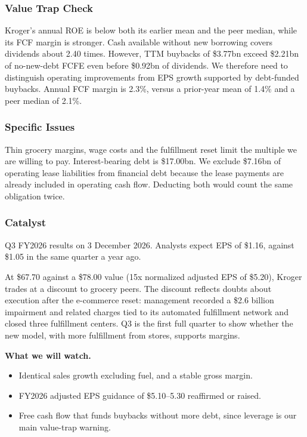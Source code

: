 \documentclass[10pt,a4paper]{article}
\begin{document}
\subsubsection*{Value Trap Check}
Kroger's annual ROE is below both its earlier mean and the peer median, while its FCF margin is stronger. Cash available without new borrowing covers dividends about 2.40 times. However, TTM buybacks of \$3.77bn exceed \$2.21bn of no-new-debt FCFE even before \$0.92bn of dividends. We therefore need to distinguish operating improvements from EPS growth supported by debt-funded buybacks. Annual FCF margin is 2.3\%, versus a prior-year mean of 1.4\% and a peer median of 2.1\%.

\subsubsection*{Specific Issues}
Thin grocery margins, wage costs and the fulfillment reset limit the multiple we are willing to pay. Interest-bearing debt is \$17.00bn. We exclude \$7.16bn of operating lease liabilities from financial debt because the lease payments are already included in operating cash flow. Deducting both would count the same obligation twice.

\subsubsection*{Catalyst}
Q3 FY2026 results on 3 December 2026. Analysts expect EPS of \$1.16, against \$1.05 in the same quarter a year ago.

At \$67.70 against a \$78.00 value (15x normalized adjusted EPS of \$5.20), Kroger trades at a discount to grocery peers. The discount reflects doubts about execution after the e-commerce reset: management recorded a \$2.6 billion impairment and related charges tied to its automated fulfillment network and closed three fulfillment centers. Q3 is the first full quarter to show whether the new model, with more fulfillment from stores, supports margins.

\textbf{What we will watch.}
\begin{itemize}[leftmargin=1.2em,itemsep=2pt,topsep=2pt]
  \item Identical sales growth excluding fuel, and a stable gross margin.
  \item FY2026 adjusted EPS guidance of \$5.10--5.30 reaffirmed or raised.
  \item Free cash flow that funds buybacks without more debt, since leverage is our main value-trap warning.
\end{itemize}
\end{document}
